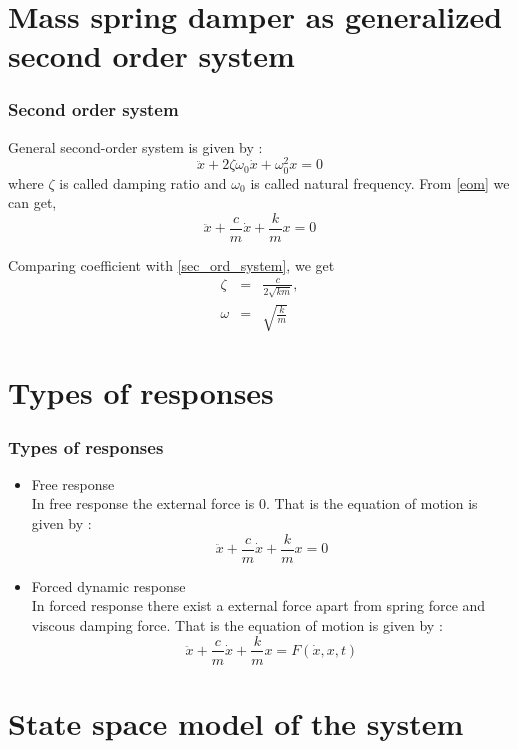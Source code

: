 \documentclass[10pt]{beamer}
\begin{document}
\section{Mass spring damper as generalized second order system}

\begin{frame}
\frametitle{Second order system}
General second-order system is given by :
\begin{equation}
\ddot{x} + 2\zeta\omega_0\dot{x} + \omega_0^2x = 0
\label{sec_ord_system}
\end{equation}
where $\zeta$ is called damping ratio and $\omega_0$ is called natural frequency.
From \ref{eom} we can get,
\begin{equation}
\ddot{x} + \frac{c}{m}\dot{x} + \frac{k}{m}x = 0
\label{mass_spring_system}
\end{equation}

Comparing coefficient with \ref{sec_ord_system}, we get
\begin{eqnarray}
\zeta &=& \frac{c}{2\sqrt{km}}, \\
\label{def_zeta}
\omega &=& \sqrt{\frac{k}{m}}
\label{def_omega}
\end{eqnarray}

\end{frame}

\section{Types of responses}

\begin{frame}
\frametitle{Types of responses}
\begin{itemize}
	\item{Free response}\\
	In free response the external force is 0. That is the equation of 
	motion is given by :
	$$ \ddot{x} + \frac{c}{m}\dot{x} + \frac{k}{m}x = 0 $$

	\item{Forced dynamic response}\\
	In forced response there exist a external force apart from spring force and 
	viscous damping force. That is the equation of motion is given by :
	$$ \ddot{x} + \frac{c}{m}\dot{x} + \frac{k}{m}x = F(\dot{x},x,t) $$

\end{itemize}

\end{frame}


\section{State space model of the system}
\end{document}
